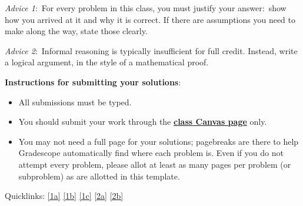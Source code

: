 \documentclass[12pt]{article}
\begin{document}
\renewcommand{\headrulewidth}{0.5pt}

\phantom{Test}

\begin{small}
\textit{Advice 1}:\ For every problem in this class, you must justify your answer:\ show how you arrived at it and why it is correct. If there are assumptions you need to make along the way, state those clearly.

\vspace{-3mm} 
\textit{Advice 2}:\ Informal reasoning is typically insufficient for full credit. Instead, write a logical argument, in the style of a mathematical proof.

\textbf{Instructions for submitting your solutions}:
\vspace{-5mm} 

\begin{itemize}
	\item All submissions must be typed.
	\item You should submit your work through the \href{https://canvas.colorado.edu/courses/59906}{\textbf{class Canvas page}} only.
	\item You may not need a full page for your solutions; pagebreaks are there to help Gradescope automatically find where each problem is. Even if you do not attempt every problem, please allot at least as many pages per problem (or subproblem) as are allotted in this template.
\end{itemize}

Quicklinks: \ref{1a} \ref{1b} \ref{1c}  \ref{2a} \ref{2b}
\vspace{-4mm} 
\end{small}


\hrulefill

\newpage
\end{document}
